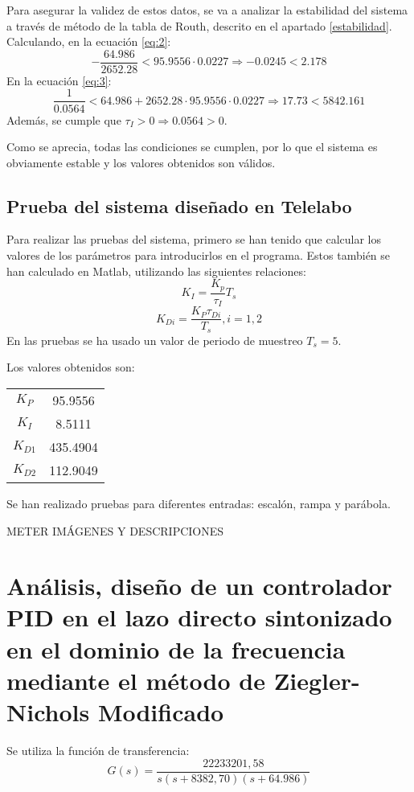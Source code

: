 \documentclass[a4paper]{article}
\begin{document}
Para asegurar la validez de estos datos, se va a analizar la estabilidad del sistema a través de método de la tabla de Routh, descrito en el apartado \ref{estabilidad}.
Calculando, en la ecuación \ref{eq:2}:
\begin{equation}
	-\frac{64.986}{2652.28}< 95.9556\cdot0.0227 \Rightarrow
	-0.0245<2.178
\end{equation}
En la ecuación \ref{eq:3}:
\begin{equation}
	\frac{1}{0.0564} < 64.986+2652.28\cdot95.9556\cdot0.0227 \Rightarrow
	17.73<5842.161
\end{equation}
Además, se cumple que $\tau_I > 0 \Rightarrow 0.0564>0$.

Como se aprecia, todas las condiciones se cumplen, por lo que el sistema es obviamente estable y los valores obtenidos son válidos.

\subsection{Prueba del sistema diseñado en Telelabo \label{sec:pruebas}}
Para realizar las pruebas del sistema, primero se han tenido que calcular los valores de los parámetros para introducirlos en el programa. Estos también se han calculado en Matlab, utilizando las siguientes relaciones:
\begin{equation}
K_I=\frac{K_p}{\tau_I} T_s
\end{equation}
\begin{equation}
K_{Di}=\frac{K_P \tau_{Di}}{T_s}, i=1,2
\end{equation}
En las pruebas se ha usado un valor de periodo de muestreo $T_s=5$.

Los valores obtenidos son:
\begin{center}
	\begin{tabular}{c|c}
		$K_P$ & 95.9556 \\
		$K_I$ & 8.5111 \\
		$K_{D1}$ & 435.4904 \\
		$K_{D2}$ & 112.9049 \\
	\end{tabular}
\end{center}

Se han realizado pruebas para diferentes entradas: escalón, rampa y parábola.

METER IMÁGENES Y DESCRIPCIONES

\section{Análisis, diseño de un controlador PID en el lazo directo sintonizado en el dominio de la frecuencia mediante el método de Ziegler-Nichols Modificado}
Se utiliza la función de transferencia:
\begin{equation}
G(s)=\frac{22233201,58}{s(s+8382,70)(s+64.986)}
\end{equation}
\end{document}
